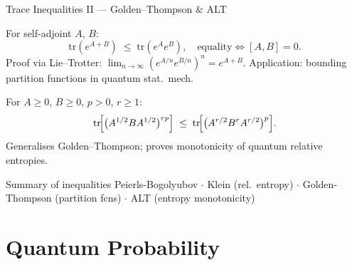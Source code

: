 \documentclass{beamer}
\newcommand{\tr}{\mathrm{tr}}
\begin{document}
\begin{frame}[shrink=10]{Trace Inequalities II --- Golden--Thompson \& ALT}
  \small
  \begin{tcolorbox}[thmbox={Golden--Thompson Inequality}, left=3pt, right=3pt, top=2pt, bottom=2pt]
    For self-adjoint $A$, $B$:
    \[
      \tr(e^{A+B}) \;\le\; \tr(e^A e^B), \quad \text{equality}\Leftrightarrow [A,B]=0.
    \]
    Proof via Lie--Trotter: $\lim_{n\to\infty}(e^{A/n}e^{B/n})^n=e^{A+B}$.
    Application: bounding partition functions in quantum stat.\ mech.
  \end{tcolorbox}

  \vspace{0.2em}
  \begin{tcolorbox}[thmbox={Araki--Lieb--Thirring (ALT) Inequality}, left=3pt, right=3pt, top=2pt, bottom=2pt]
    For $A\ge 0$, $B\ge 0$, $p>0$, $r\ge 1$:
    \[
      \tr\!\Bigl[\bigl(A^{1/2}BA^{1/2}\bigr)^{rp}\Bigr]
      \;\le\;
      \tr\!\Bigl[\bigl(A^{r/2}B^r A^{r/2}\bigr)^p\Bigr].
    \]
    Generalises Golden--Thompson; proves monotonicity of quantum relative entropies.
  \end{tcolorbox}

  \vspace{0.2em}
  \begin{block}{Summary of inequalities}
    \centering
    Peierls-Bogolyubov $\cdot$ Klein (rel.\ entropy) $\cdot$ Golden-Thompson (partition fcns) $\cdot$ ALT (entropy monotonicity)
  \end{block}
\end{frame}

\section{Quantum Probability}
\end{document}
